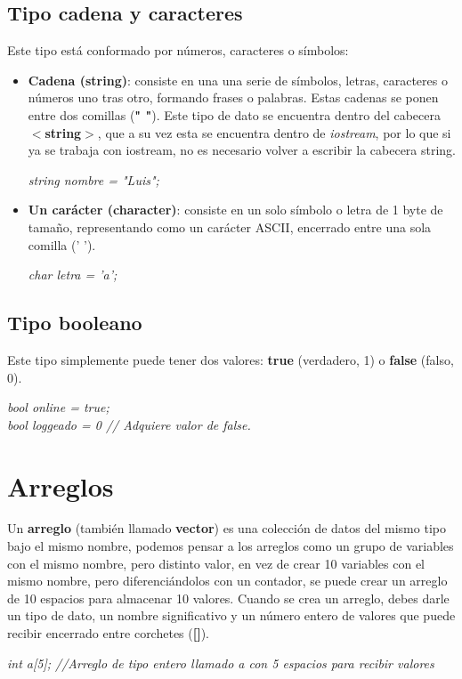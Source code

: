 \subsection{Tipo cadena y caracteres}
\hspace{0.55cm}Este tipo está conformado por números, caracteres o símbolos:
\begin{itemize}
    \item \textbf{Cadena (string)}: consiste en una una serie de símbolos, letras, caracteres o números uno tras otro, formando frases o palabras. Estas cadenas se ponen entre dos comillas (\textbf{" "}). Este tipo de dato se encuentra dentro del cabecera \textbf{$<$string$>$}, que a su vez esta se encuentra dentro de \textit{iostream}, por lo que si ya se trabaja con iostream, no es necesario volver a escribir la cabecera string.
    \begin{center}
        \textit{string nombre = "Luis";}
    \end{center}
    \item \textbf{Un carácter (character)}: consiste en un solo símbolo o letra de 1 byte de tamaño, representando como un carácter ASCII, encerrado entre una sola comilla (' ').
    \begin{center}
        \textit{char letra = 'a';}
    \end{center}
\end{itemize}


\subsection{Tipo booleano}
\hspace{0.55cm}Este tipo simplemente puede tener dos valores: \textbf{true} (verdadero, 1) o \textbf{false} (falso, 0).
\begin{center}
    \textit{
        bool online = true; \\
        bool loggeado = 0 // Adquiere valor de false.
    }
\end{center}



\section{Arreglos}
\hspace{0.55cm}Un \textbf{arreglo} (también llamado \textbf{vector}) es una colección de datos del mismo tipo bajo el mismo nombre, podemos pensar a los arreglos como un grupo de variables con el mismo nombre, pero distinto valor, en vez de crear 10 variables con el mismo nombre, pero diferenciándolos con un contador, se puede crear un arreglo de 10 espacios para almacenar 10 valores. Cuando se crea un arreglo, debes darle un tipo de dato, un nombre significativo y un número entero de valores que puede recibir encerrado entre corchetes (\textbf{[]}).
\begin{center}
    \textit{int a[5]; //Arreglo de tipo entero llamado a con 5 espacios para recibir valores}
\end{center}

